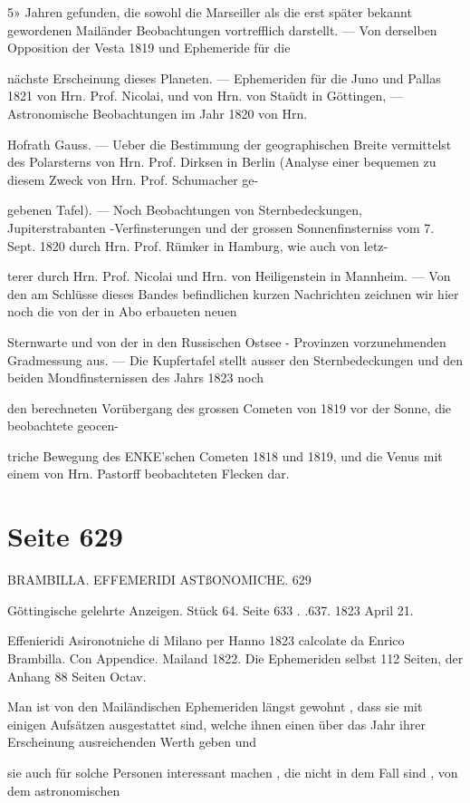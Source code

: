\documentclass[10pt,a4paper]{article}
\begin{document}
5» Jahren gefunden, die sowohl die Marseiller als die erst später bekannt gewordenen Mailänder Beobachtungen vortrefflich darstellt. — Von derselben Opposition der Vesta 1819 und Ephemeride für die

nächste Erscheinung dieses Planeten. — Ephemeriden für die Juno und Pallas 1821 von Hrn. Prof. Nicolai, und von Hrn. von Staüdt in Göttingen, — Astronomische Beobachtungen im Jahr 1820 von Hrn.

Hofrath Gauss. — Ueber die Bestimmung der geographischen Breite vermittelst des Polarsterns von Hrn. Prof. Dirksen in Berlin (Analyse einer bequemen zu diesem Zweck von Hrn. Prof. Schumacher ge-

gebenen Tafel). — Noch Beobachtungen von Sternbedeckungen, Jupiterstrabanten -Verfinsterungen und der grossen Sonnenfinsterniss vom 7. Sept. 1820 durch Hrn. Prof. Rümker in Hamburg, wie auch von letz-

terer durch Hrn. Prof. Nicolai und Hrn. von Heiligenstein in Mannheim. — Von den am Schlüsse dieses Bandes befindlichen kurzen Nachrichten zeichnen wir hier noch die von der in Abo erbaueten neuen

Sternwarte und von der in den Russischen Ostsee - Provinzen vorzunehmenden Gradmessung aus. — Die Kupfertafel stellt ausser den Sternbedeckungen und den beiden Mondfinsternissen des Jahrs 1823 noch

den berechneten Vorübergang des grossen Cometen von 1819 vor der Sonne, die beobachtete geocen-

triche Bewegung des ENKE'schen Cometen 1818 und 1819, und die Venus mit einem von Hrn. Pastorff beobachteten Flecken dar.


\newpage
\section*{Seite 629}
BRAMBILLA. EFFEMERIDI ASTßONOMICHE. 629

Göttingische gelehrte Anzeigen. Stück 64. Seite 633 . .637. 1823 April 21.

Effenieridi Asironotniche di Milano per Hanno 1823 calcolate da Enrico Brambilla. Con Appendice. Mailand 1822. Die Ephemeriden selbst 112 Seiten, der Anhang 88 Seiten Octav.

Man ist von den Mailändischen Ephemeriden längst gewohnt , dass sie mit einigen Aufsätzen ausgestattet sind, welche ihnen einen über das Jahr ihrer Erscheinung ausreichenden Werth geben und

sie auch für solche Personen interessant machen , die nicht in dem Fall sind , von dem astronomischen
\end{document}
